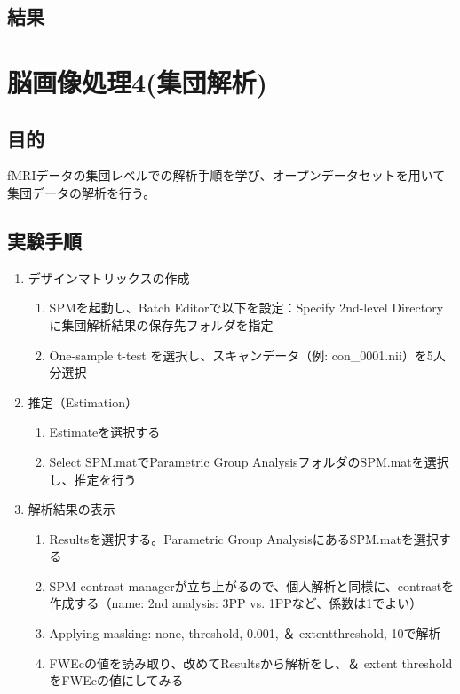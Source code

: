 \documentclass{jlreq}
\begin{document}
\subsection{結果}

\section{脳画像処理4(集団解析)}
\subsection{目的}
fMRIデータの集団レベルでの解析手順を学び、オープンデータセットを用いて集団データの解析を行う。

\subsection{実験手順}
\begin{enumerate}
    \item デザインマトリックスの作成
        \begin{enumerate}
            \item SPMを起動し、Batch Editorで以下を設定：Specify 2nd-level Directory に集団解析結果の保存先フォルダを指定
            \item One-sample t-test を選択し、スキャンデータ（例: con\_0001.nii）を5人分選択
        \end{enumerate}
    \item 推定（Estimation）
        \begin{enumerate}
            \item Estimateを選択する
            \item Select SPM.matでParametric Group AnalysisフォルダのSPM.matを選択し、推定を行う
        \end{enumerate}
    \item 解析結果の表示
        \begin{enumerate}
            \item Resultsを選択する。Parametric Group AnalysisにあるSPM.matを選択する
            \item SPM contrast managerが立ち上がるので、個人解析と同様に、contrastを作成する（name: 2nd
                analysis: 3PP vs. 1PPなど、係数は1でよい）
            \item Applying masking: none, threshold, 0.001, ＆ extentthreshold, 10で解析
            \item FWEcの値を読み取り、改めてResultsから解析をし、＆ extent thresholdをFWEcの値にしてみる
        \end{enumerate}
\end{enumerate}
\end{document}
